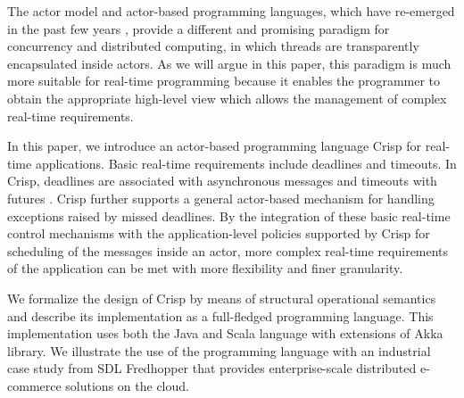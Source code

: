 The actor model \cite{fnd:actor:cmpt:agha} and actor-based programming languages, which
have re-emerged in the past few years \cite{kilim:Srinivasan:Mycroft,erlang:armstrong,scala:actors:ordersky,creol:broch:owe,salsa:agha}, 
provide a different and promising paradigm for concurrency and distributed computing, in which threads are transparently encapsulated inside actors.
As we will argue in this paper, this paradigm is much more suitable for real-time programming because it enables the programmer to 
obtain the appropriate   high-level view which allows the management of   complex
real-time requirements.

In this paper, we introduce an actor-based programming language Crisp for real-time applications. 
Basic real-time requirements include deadlines and timeouts.
In Crisp, deadlines are associated with asynchronous messages and timeouts  with futures \cite{BoerCJ07}.
Crisp further supports a general actor-based mechanism for handling exceptions raised by  missed deadlines.
By the  integration  of these basic real-time control mechanisms with the application-level policies supported by Crisp for scheduling of the messages inside an actor,
more complex real-time requirements of the application can be met with more flexibility and finer granularity.

We formalize the design of Crisp by means of structural  operational semantics \cite{plotkin:sos} and 
describe its implementation as a full-fledged programming language.
This implementation uses both the Java and Scala language with extensions of Akka library.
We illustrate the use of the programming language with an industrial case study from SDL Fredhopper that provides enterprise-scale distributed e-commerce solutions on the cloud.

